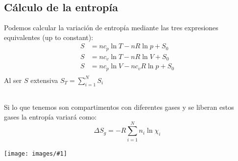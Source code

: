 \documentclass{myclass}
\newcommand{\incimg}[1]{%
    \texttt{[image: images/\#1]}
}
\begin{document}
\subsection{Cálculo de la entropía}
Podemos calcular la variación de entropía mediante las tres expresiones equivalentes (up to constant):
\begin{align*}
  S &= nc_p\ln T - nR\ln p + S_0 \\  
  S &= nc_v\ln T - nR\ln V + S_0 \\  
  S &= nc_p\ln V - nc_vR\ln p + S_0 \\  
\end{align*}
Al ser $S$ extensiva $\displaystyle S_T = \sum_{i=1}^{N} S_i$ \\
\\
\begin{minipage}{0.7\textwidth}
Si lo que tenemos son compartimentos con diferentes gases y se liberan estos gases la entropía variará como:
$$\displaystyle\Delta S_g=-R \sum_{i=1}^{N} n_i\ln\chi_i$$
\end{minipage}
\begin{minipage}{0.25\textwidth}
    \incimg{MezclaGases.png}
\end{minipage}
\end{document}

